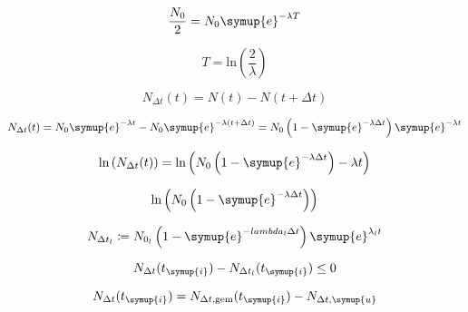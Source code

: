 \begin{equation}
   \frac{N_0}{2} = N_0 \symup{e}^{- \lambda T}  \nonumber
\end{equation}

\begin{equation}
   T = \text{ln}\left(\frac{2}{\lambda}\right) \nonumber
\end{equation}

\begin{equation}
   N_{\Delta t}(t) = N(t) - N(t + \Delta t) \nonumber
\end{equation}

\begin{equation}
   N_{\Delta t}(t) = N_0 \symup{e}^{ - \lambda t} - N_0 \symup{e}^{- \lambda \left( t + \Delta t \right) } = N_0 \left( 1 - \symup{e}^{-\lambda \Delta t} \right) \symup{e}^{-\lambda t} \nonumber
\end{equation}

\begin{equation}
   \text{ln} \left( N_{\Delta t}(t)\right) = \text{ln} \left( N_0 \left( 1- \symup{e}^{-\lambda \Delta t}\right) -\lambda t \right) \nonumber
\end{equation}

\begin{equation}
   \text{ln}\left(N_0\left(1- \symup{e}^{-\lambda\Delta t}\right)  \right) \nonumber
\end{equation}

\begin{equation}
   N_{\Delta t_{l}} \coloneqq N_{0_l}\left( 1- \symup{e}^{-lambda_{l} \Delta t}\right) \symup{e}^{\lambda_l t} \nonumber
\end{equation}

\begin{equation}
   N_{\Delta t}(t_{\symup{i}}) - N_{\Delta t_l}(t_{\symup{i}}) \leq 0 \nonumber
\end{equation}

\begin{equation}
   N_{\Delta t} (t_{\symup{i}}) = N_{\Delta t , \text{gem}}(t_{\symup{i}}) - N_{\Delta t, \symup{u}} \nonumber
\end{equation}